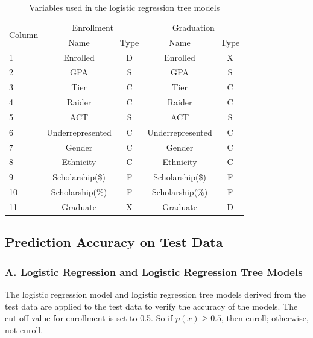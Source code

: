 \documentclass[12pt,english]{report}
\begin{document}
\begin{table}[H]
\centering
\begin{tabular}{|l|c|c|c|c|}
\hline %
\multicolumn{1}{|c|}{\multirow{2}{*}{Column}} & \multicolumn{2}{c|}{Enrollment}
& \multicolumn{2}{c|}{Graduation}                            \\ \cline{2-5}
\multicolumn{1}{|c|}{}                        & Name                          &
Type    & Name     & Type  \\ \hline
1                                             & Enrolled                      &
D                        & Enrolled                      & X
\\ \hline
2                                             & GPA                           &
S                        & GPA                           & S
\\ \hline
3      & Tier   & C    &   Tier   & C    \\ \hline
4    & Raider     & C   &   Raider  & C   \\ \hline
5   & ACT    & S  &  ACT    & S     \\ \hline
6   & Underrepresented & C     & Underrepresented    & C   \\ \hline
7    & Gender   & C   &  Gender  & C   \\ \hline
8   & Ethnicity    & C     & Ethnicity   & C      \\ \hline
9   & Scholarship(\$)    & F   & Scholarship(\$)     & F    \\ \hline
10  & Scholarship(\%)   & F     & Scholarship(\%)     & F  \\ \hline
11  & Graduate   & X     &   Graduate        & D         \\ \hline

\end{tabular}
\caption{Variables used in the logistic regression tree models}
\end{table}

\subsection{Prediction Accuracy on Test Data}
\subsubsection{A. Logistic Regression and Logistic Regression Tree Models }
The logistic regression model and logistic regression tree models derived from the test data are applied to the test data to verify the accuracy of the models.  The cut-off value for enrollment is set to 0.5. So if  $p(x) \geq 0.5$, then enroll;  otherwise, not enroll.   
\end{document}
